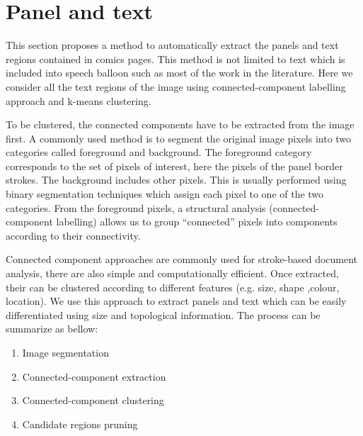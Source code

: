 
\section{Panel and text} %
\label{sec:se:panel_and_text}


This section proposes a method to automatically extract the panels and text regions contained in comics pages.
This method is not limited to text which is included into speech balloon such as most of the work in the literature.
Here we consider all the text regions of the image using connected-component labelling approach and k-means clustering.


To be clustered, the connected components have to be extracted from the image first.
A commonly used method is to segment the original image pixels into two categories called foreground and background.
The foreground category corresponds to the set of pixels of interest, here the pixels of the panel border strokes.
The background includes other pixels.
This is usually performed using binary segmentation techniques which assign each pixel to one of the two categories.
From the foreground pixels, a structural analysis (connected-component labelling) allows us to group ``connected'' pixels into components according to their connectivity.

Connected component approaches are commonly used for stroke-based document analysis, there are also simple and computationally efficient.
Once extracted, their can be clustered according to different features (e.g. size, shape ,colour, location).
We use this approach to extract panels and text which can be easily differentiated using size and topological information.
The process can be summarize as bellow:
  \begin{enumerate}
	\item Image segmentation
	\item Connected-component extraction
	\item Connected-component clustering
	\item Candidate regions pruning
  \end{enumerate}


